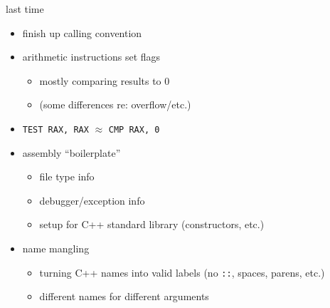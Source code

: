 \begin{comment}
\begin{frame}{last time}
    \begin{itemize}
    \item specifying memory locations
        \begin{itemize}
            \item \texttt{DWORD PTR [RAX+4*RBX+17]}
        \end{itemize}
    \item multiply/divide
    \item LEA
    \item calling convention: rules so we can call functions consistently
        \begin{itemize}
            \item where arguments, return value are
            \item who needs to save/restore register values
        \end{itemize}
    \end{itemize}
\end{frame}
\end{comment}

\begin{frame}{last time}
    \begin{itemize}
    \item finish up calling convention
    \item arithmetic instructions set flags
        \begin{itemize}
        \item mostly comparing results to 0
        \item (some differences re: overflow/etc.)
        \end{itemize}
    \item \texttt{TEST RAX, RAX} $\approx$ \texttt{CMP RAX, 0}
    \item assembly ``boilerplate''
        \begin{itemize}
        \item file type info
        \item debugger/exception info
        \item setup for C++ standard library (constructors, etc.)
        \end{itemize}
    \item name mangling
        \begin{itemize}
        \item turning C++ names into valid labels (no \texttt{::}, spaces, parens, etc.)
        \item different names for different arguments
        \end{itemize}
    \end{itemize}
\end{frame}
